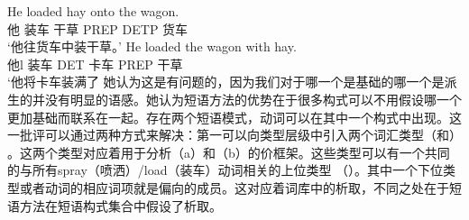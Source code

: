\begin{exe}
\begin{xlist}[iv.]
\begin{exe}
\begin{xlist}[iv.]
\eal
\ex
\gll He loaded hay onto the wagon.\\
     他 装车 干草 PREP DETP 货车\\
\glt `他往货车中装干草。' 
\ex
\gll He loaded the wagon with hay.\\
     他l 装车 DET 卡车 PREP 干草\\
\glt `他将卡车装满了 
\zl
她认为这是有问题的，因为我们对于哪一个是基础的哪一个是派生的并没有明显的语感。她认为短语方法的优势在于很多构式可以不用假设哪一个更加基础而联系在一起。存在两个短语模式，动词可以在其中一个构式中出现。这一批评可以通过两种方式来解决：第一可以向类型层级中引入两个词汇类型（和） 。这两个类型对应着用于分析（a）和（b）的价框架。这些类型可以有一个共同的与所有spray（喷洒）/load（装车）动词相关的上位类型 （）。其中一个下位类型或者动词的相应词项就是偏向的成员。这对应着词库中的析取，不同之处在于短语方法在短语构式集合中假设了析取。


\end{xlist}
\end{exe}
\end{xlist}
\end{exe}
